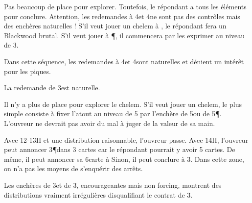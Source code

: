 \titre{2\C--2\P--3\C}
\begin{multicols}{2}

Pas beaucoup de place pour explorer. Toutefois, le répondant a tous les éléments pour conclure. Attention, les redemandes à 4\T et 4\K ne sont pas des contrôles mais des enchères naturelles ! S'il veut jouer un chelem à \C, le répondant fera un Blackwood brutal. S'il veut jouer à \P, il commencera par les exprimer au niveau de 3.

\end{multicols}

\titre{2\C--2\P--3\P}
\begin{multicols}{2}

Dans cette séquence, les redemandes à 4\T et 4\K sont naturelles et dénient un intérêt pour les piques.

La redemande de 3\NT est naturelle.

Il n'y a plus de place pour explorer le chelem.  S'il veut jouer un chelem, le plus simple consiste à fixer l'atout au niveau de 5 par l'enchère de 5\C ou de 5\P. L'ouvreur ne devrait pas avoir du mal à juger de la valeur de sa main.

\end{multicols}

\titre{2\C--2\NT}

\begin{multicols}{2}

Avec 12-13H et une distribution raisonnable, l'ouvreur passe.
Avec 14H, l'ouvreur peut annoncer 3\P dans 3 cartes car le répondant pourrait y avoir 5 cartes. De même, il peut annoncer sa 6\ieme carte à \C
Sinon, il peut conclure à 3\NT. Dans cette zone, on n'a pas les moyens de s'enquérir des arrêts.

Les enchères de 3\T et de 3\K, encourageantes mais non forcing, montrent des distributions vraiment irrégulières disqualifiant le contrat de 3\NT.
\end{multicols}

